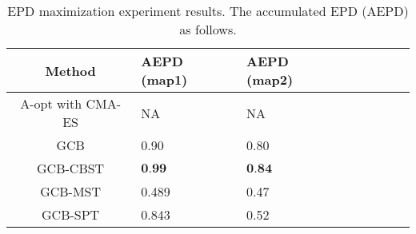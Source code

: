 
\begin{table}[htbp]
   \caption{
   EPD maximization experiment results.
   The accumulated EPD (AEPD) as follows.
   }
   \begin{center}
     \begin{tabular}{| c | l | l | l | l | l |  l | l |} \hline
     Method & AEPD (map1) & AEPD (map2)\\ \hline
     A-opt with CMA-ES  & NA & NA \\ \hline
     GCB           & 0.90 & 0.80\\ \hline
     GCB-CBST & $\textbf{0.99}$ & $\textbf{0.84}$ \\ \hline
     GCB-MST  & 0.489 & 0.47 \\ \hline
     GCB-SPT  & 0.843 & 0.52 \\ \hline
    \end{tabular}
   \end{center}
   \label{tab:EPD_map}
\end{table}


